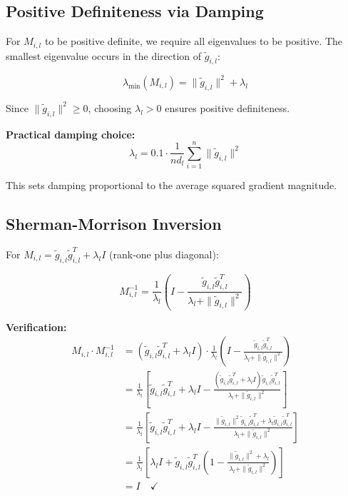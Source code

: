 \documentclass{article}
\begin{document}
\subsection{Positive Definiteness via Damping}

For $M_{i,l}$ to be positive definite, we require all eigenvalues to be positive. The smallest eigenvalue occurs in the direction of $\tilde{g}_{i,l}$:

\begin{equation}
\lambda_{\min}(M_{i,l}) = \|\tilde{g}_{i,l}\|^2 + \lambda_l
\end{equation}

Since $\|\tilde{g}_{i,l}\|^2 \geq 0$, choosing $\lambda_l > 0$ ensures positive definiteness.

\textbf{Practical damping choice:}
\begin{equation}
\lambda_l = 0.1 \cdot \frac{1}{n d_l}\sum_{i=1}^n \|\tilde{g}_{i,l}\|^2
\end{equation}

This sets damping proportional to the average squared gradient magnitude.

\subsection{Sherman-Morrison Inversion}

For $M_{i,l} = \tilde{g}_{i,l}\tilde{g}_{i,l}^T + \lambda_l I$ (rank-one plus diagonal):

\begin{equation}
M_{i,l}^{-1} = \frac{1}{\lambda_l}\left(I - \frac{\tilde{g}_{i,l}\tilde{g}_{i,l}^T}{\lambda_l + \|\tilde{g}_{i,l}\|^2}\right)
\end{equation}

\textbf{Verification:} 
\begin{align}
M_{i,l} \cdot M_{i,l}^{-1} &= (\tilde{g}_{i,l}\tilde{g}_{i,l}^T + \lambda_l I) \cdot \frac{1}{\lambda_l}\left(I - \frac{\tilde{g}_{i,l}\tilde{g}_{i,l}^T}{\lambda_l + \|\tilde{g}_{i,l}\|^2}\right) \\
&= \frac{1}{\lambda_l}\left[\tilde{g}_{i,l}\tilde{g}_{i,l}^T + \lambda_l I - \frac{(\tilde{g}_{i,l}\tilde{g}_{i,l}^T + \lambda_l I)\tilde{g}_{i,l}\tilde{g}_{i,l}^T}{\lambda_l + \|\tilde{g}_{i,l}\|^2}\right] \\
&= \frac{1}{\lambda_l}\left[\tilde{g}_{i,l}\tilde{g}_{i,l}^T + \lambda_l I - \frac{\|\tilde{g}_{i,l}\|^2 \tilde{g}_{i,l}\tilde{g}_{i,l}^T + \lambda_l \tilde{g}_{i,l}\tilde{g}_{i,l}^T}{\lambda_l + \|\tilde{g}_{i,l}\|^2}\right] \\
&= \frac{1}{\lambda_l}\left[\lambda_l I + \tilde{g}_{i,l}\tilde{g}_{i,l}^T\left(1 - \frac{\|\tilde{g}_{i,l}\|^2 + \lambda_l}{\lambda_l + \|\tilde{g}_{i,l}\|^2}\right)\right] \\
&= I \quad \checkmark
\end{align}
\end{document}
